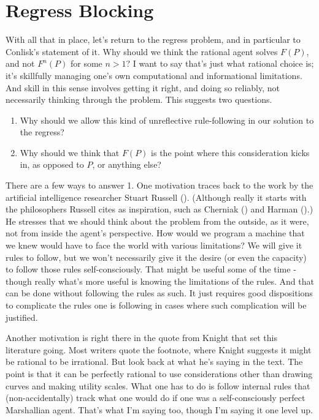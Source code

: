 \documentclass[
  11pt,
  letterpaper,
  DIV=11,
  numbers=noendperiod,
  oneside]{scrartcl}
\providecommand{\tightlist}{%
  \setlength{\itemsep}{0pt}\setlength{\parskip}{0pt}}\usepackage{longtable,booktabs,array}
\begin{document}
\section{Regress Blocking}\label{regress-blocking}

With all that in place, let's return to the regress problem, and in
particular to Conlisk's statement of it. Why should we think the
rational agent solves \(F(P)\), and not \(F^n(P)\) for some \(n > 1\)? I
want to say that's just what rational choice is; it's skillfully
managing one's own computational and informational limitations. And
skill in this sense involves getting it right, and doing so reliably,
not necessarily thinking through the problem. This suggests two
questions.

\begin{enumerate}
\def\labelenumi{\arabic{enumi}.}
\tightlist
\item
  Why should we allow this kind of unreflective rule-following in our
  solution to the regress?
\item
  Why should we think that \(F(P)\) is the point where this
  consideration kicks in, as opposed to \(P\), or anything else?
\end{enumerate}

There are a few ways to answer 1. One motivation traces back to the work
by the artificial intelligence researcher Stuart Russell
(). (Although really it starts with the
philosophers Russell cites as inspiration, such as Cherniak
() and Harman
().) He stresses that we should think
about the problem from the outside, as it were, not from inside the
agent's perspective. How would we program a machine that we knew would
have to face the world with various limitations? We will give it rules
to follow, but we won't necessarily give it the desire (or even the
capacity) to follow those rules self-consciously. That might be useful
some of the time - though really what's more useful is knowing the
limitations of the rules. And that can be done without following the
rules as such. It just requires good dispositions to complicate the
rules one is following in cases where such complication will be
justified.

Another motivation is right there in the quote from Knight that set this
literature going. Most writers quote the footnote, where Knight suggests
it might be rational to be irrational. But look back at what he's saying
in the text. The point is that it can be perfectly rational to use
considerations other than drawing curves and making utility scales. What
one has to do is follow internal rules that (non-accidentally) track
what one would do if one was a self-consciously perfect Marshallian
agent. That's what I'm saying too, though I'm saying it one level up.
\end{document}
